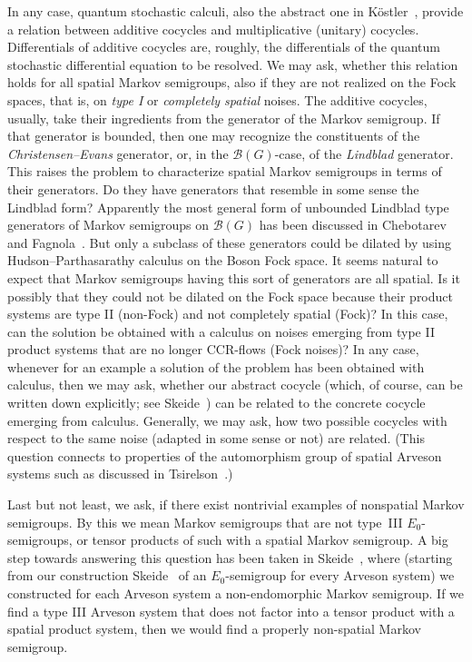 \documentclass[pdftex]{sigma}%
\newcommand{\eus}[1]{\mathscr{#1}}
\newcommand{\sB}{\eus{B}}
\numberwithin{equation}{section}
\begin{document}
In any case, quantum stochastic calculi, also the abstract one in K\"ostler~\cite{Koes00}, provide a relation between additive cocycles and multiplicative (unitary) cocycles. Differentials of additive cocycles are, roughly, the differentials of the quantum stochastic differential equation to be resolved. We may ask, whether this relation holds for all spatial Markov semigroups, also if they are not realized on the Fock spaces, that is, on {\it type I} or {\it completely spatial} noises. The additive cocycles, usually, take their ingredients from the generator of the Markov semigroup. If that generator is bounded, then one may recognize the constituents of the {\it Christensen--Evans} generator, or, in the $\sB(G)$-case, of the {\it Lindblad} generator. This raises the problem to characterize spatial Markov semigroups in terms of their generators. Do they have generators that resemble in some sense the Lindblad form? Apparently the most general form of unbounded Lindblad type generators of Markov semigroups on $\sB(G)$ has been discussed in Chebotarev and Fagnola~\cite{CheFa98}. But only a subclass of these generators could be dilated by using Hudson--Parthasarathy calculus on the Boson Fock space. It seems natural to expect that Markov semigroups having this sort of generators are all spatial. Is it possibly that they could not be dilated on the Fock space because their product systems are type II (non-Fock) and not completely spatial (Fock)? In this case, can the solution be obtained with a calculus on noises emerging from type II product systems that are no longer CCR-flows (Fock noises)? In any case, whenever for an example a solution of the problem has been obtained with calculus, then we may ask, whether our abstract cocycle (which, of course, can be written down explicitly; see Skeide~\cite{Ske16}) can be related to the concrete cocycle emerging from calculus. Generally, we may ask, how two possible cocycles with respect to the same noise (adapted in some sense or not) are related. (This question connects to properties of the automorphism group of spatial Arveson systems such as discussed in Tsirelson~\cite{Tsi08}.)

Last but not least, we ask, if there exist nontrivial examples of nonspatial Markov semigroups. By this we mean Markov semigroups that are not type~III $E_0$-semigroups, or tensor products of such with a spatial Markov semigroup. A big step towards answering this question has been taken in Skeide~\cite{Ske12}, where (starting from our construction Skeide~\cite{Ske06} of an $E_0$-semigroup for every Arveson system) we constructed for each Arveson system a non-endomorphic Markov semigroup. If we find a type III Arveson system that does not factor into a tensor product with a spatial product system, then we would find a properly non-spatial Markov semigroup.
\end{document}
